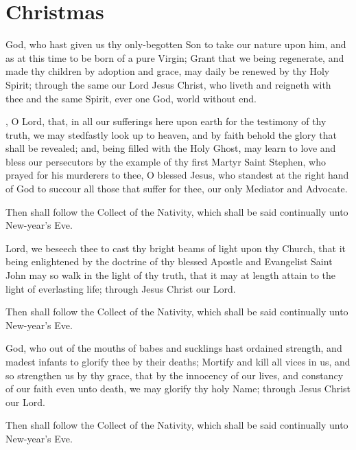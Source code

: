 \section{Christmas}

 God, who hast given us thy only-begotten Son to take our nature upon him, and as at this time to be born of a pure Virgin; Grant that we being regenerate, and made thy children by adoption and grace, may daily be renewed by thy Holy Spirit; through the same our Lord Jesus Christ, who liveth and reigneth with thee and the same Spirit, ever one God, world without end.

, O Lord, that, in all our sufferings here upon earth for the testimony of thy truth, we may stedfastly look up to heaven, and by faith behold the glory that shall be revealed; and, being filled with the Holy Ghost, may learn to love and bless our persecutors by the example of thy first Martyr Saint Stephen, who prayed for his murderers to thee, O blessed Jesus, who standest at the right hand of God to succour all those that suffer for thee, our only Mediator and Advocate.
\begin{secrubric}
Then shall follow the Collect of the Nativity, which shall be said continually unto New-year's Eve.
\end{secrubric}

 Lord, we beseech thee to cast thy bright beams of light upon thy Church, that it being enlightened by the doctrine of thy blessed Apostle and Evangelist Saint John may so walk in the light of thy truth, that it may at length attain to the light of everlasting life; through Jesus Christ our Lord.
\begin{secrubric}
Then shall follow the Collect of the Nativity, which shall be said continually unto New-year's Eve.
\end{secrubric}

 God, who out of the mouths of babes and sucklings hast ordained strength, and madest infants to glorify thee by their deaths; Mortify and kill all vices in us, and so strengthen us by thy grace, that by the innocency of our lives, and constancy of our faith even unto death, we may glorify thy holy Name; through Jesus Christ our Lord.
\begin{secrubric}
Then shall follow the Collect of the Nativity, which shall be said continually unto New-year's Eve.
\end{secrubric}

